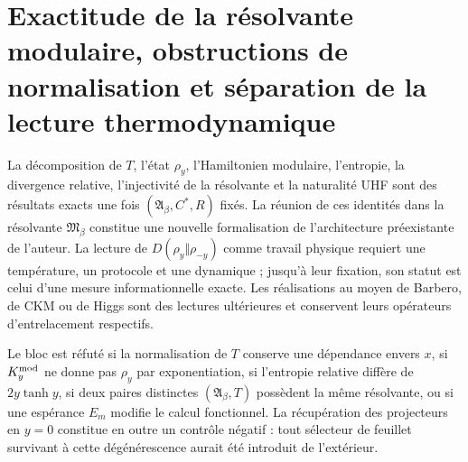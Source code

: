 \section{Exactitude de la résolvante modulaire, obstructions de normalisation et séparation de la lecture thermodynamique}

\begin{proofstatusbox}
La décomposition de \(T\), l’état \(\rho_y\), l’Hamiltonien modulaire, l’entropie, la divergence relative, l’injectivité de la résolvante et la naturalité UHF sont des résultats exacts une fois \((\mathfrak A_\beta,C^*,R)\) fixés. La réunion de ces identités dans la résolvante \(\mathfrak M_\beta\) constitue une nouvelle formalisation de l’architecture préexistante de l’auteur. La lecture de \(D(\rho_y\Vert\rho_{-y})\) comme travail physique requiert une température, un protocole et une dynamique ; jusqu’à leur fixation, son statut est celui d’une mesure informationnelle exacte. Les réalisations au moyen de Barbero, de CKM ou de Higgs sont des lectures ultérieures et conservent leurs opérateurs d’entrelacement respectifs.
\end{proofstatusbox}

\begin{falsifierbox}
Le bloc est réfuté si la normalisation de \(T\) conserve une dépendance envers \(x\), si \(K_y^{\rm mod}\) ne donne pas \(\rho_y\) par exponentiation, si l’entropie relative diffère de \(2y\tanh y\), si deux paires distinctes \((\mathfrak A_\beta,T)\) possèdent la même résolvante, ou si une espérance \(E_m\) modifie le calcul fonctionnel. La récupération des projecteurs en \(y=0\) constitue en outre un contrôle négatif : tout sélecteur de feuillet survivant à cette dégénérescence aurait été introduit de l’extérieur.
\end{falsifierbox}

